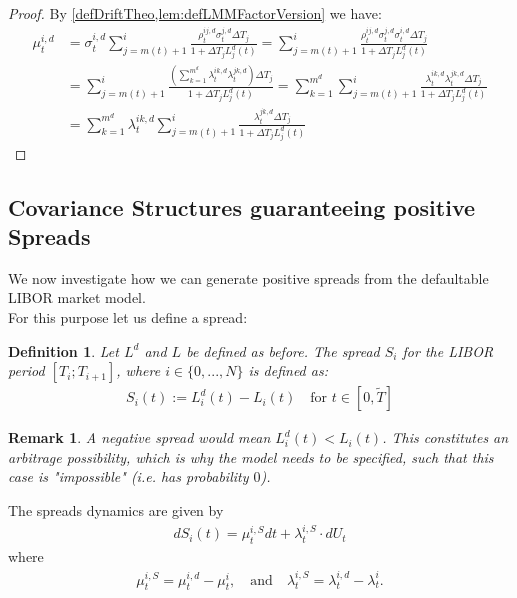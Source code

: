\documentclass[12pt]{article}
\newtheorem{remark}[theorem]{Remark}
\newtheorem{definition}[theorem]{Definition}
\begin{document}
	\begin{proof}
		By \cref{defDriftTheo,lem:defLMMFactorVersion} we have:
		\begin{align*}
			\mu^{i, d}_t &= \sigma^{i, d}_t\sum_{j=m(t)+1}^{i}\frac{\rho^{i j, d}_t \sigma^{j, d}_t\Delta T_j}{1 + \Delta T_j L^d_j(t)} = \sum_{j=m(t)+1}^{i}\frac{\rho^{i j, d}_t \sigma^{j, d}_t \sigma^{i, d}_t\Delta T_j}{1 + \Delta T_j L^d_j(t)}\\
			&= \sum_{j=m(t)+1}^{i}\frac{\left(\sum_{k=1}^{m^d}\lambda^{i k,d}_t\lambda^{j k,d}_t\right)\Delta T_j}{1 + \Delta T_j L^d_j(t)}
			=\sum_{k=1}^{m^d}\sum_{j=m(t)+1}^{i}\frac{\lambda^{i k,d}_t\lambda^{j k,d}_t\Delta T_j}{1 + \Delta T_j L^d_j(t)}\\
			&= \sum_{k=1}^{m^d}\lambda^{i k,d}_t\sum_{j=m(t)+1}^{i}\frac{\lambda^{j k,d}_t\Delta T_j}{1 + \Delta T_j L^d_j(t)}
		\end{align*}
	\end{proof}
	
	
	\subsection{Covariance Structures guaranteeing positive Spreads}
	We now investigate how we can generate positive spreads from the defaultable LIBOR market model.\\
	For this purpose let us define a spread:
	\begin{definition}
		Let $L^d$ and $L$ be defined as before.
		The \emph{spread} $S_i$ for the LIBOR period $[T_i; T_{i+1}]$, where $i \in \{0, ..., N\}$ is defined as:
		\begin{align*}
			S_i(t) := L^d_i(t) - L_i(t) \quad \text{for } t \in \left[0,\tilde{T}\right]
		\end{align*}
	\end{definition}
	\begin{remark}
		A negative spread would mean $L^d_i(t) < L_i(t)$. This constitutes an arbitrage possibility, %
		which is why the model needs to be specified, such that this case is "impossible" (i.e. has probability $0$).
	\end{remark}
	The spreads dynamics are given by
	\begin{align*}
		dS_i(t) = \mu^{i,S}_t dt + \lambda^{i,S}_t \cdot dU_t
	\end{align*}
	where 
	\begin{align*}
		\mu^{i,S}_t = \mu^{i,d}_t - \mu^{i}_t, \quad \text{and} 
		\quad \lambda^{i,S}_t = \lambda^{i,d}_t - \lambda^{i}_t.
	\end{align*}
	
\end{document}
